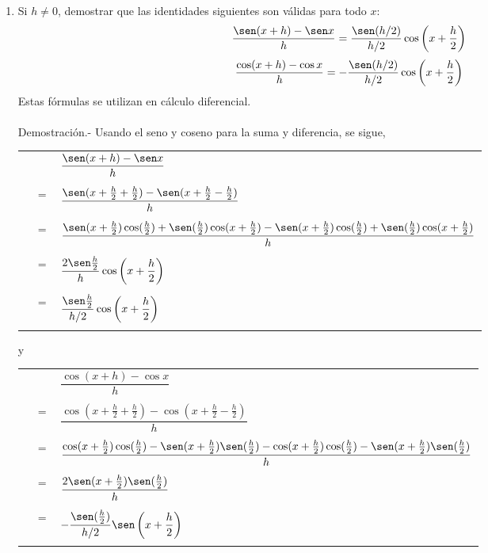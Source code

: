\begin{enumerate}[\bfseries 1.]
\item Si $h\neq 0$, demostrar que las identidades siguientes son válidas para todo $x$:
    $$\dfrac{\sen(x+h)-\sen x}{h} = \dfrac{\sen(h/2)}{h/2}\cos\left(x+\dfrac{h}{2}\right)$$
    $$\dfrac{\cos(x+h)-\cos x}{h} = -\dfrac{\sen(h/2)}{h/2}\cos\left(x+\dfrac{h}{2}\right)$$
    Estas fórmulas se utilizan en cálculo diferencial.\\\\
    Demostración.-\; Usando el seno y coseno para la suma y diferencia, se sigue,
    \begin{center}
	\begin{tabular}{rcl}
	    &&$\dfrac{\sen(x+h)-\sen x}{h}$\\\\
	    &$=$&$\dfrac{\sen(x+\frac{h}{2}+\frac{h}{2})-\sen(x+\frac{h}{2}-\frac{h}{2})}{h}$\\\\
					 &$=$&$\dfrac{\sen(x+\frac{h}{2})\cos(\frac{h}{2})+\sen(\frac{h}{2})\cos(x+\frac{h}{2})-\sen(x+\frac{h}{2})\cos (\frac{h}{2})+\sen(\frac{h}{2})\cos(x+\frac{h}{2})}{h}$\\\\
					 &$=$&$\dfrac{2\sen \frac{h}{2}}{h}\cos\left(x+\dfrac{h}{2}\right)$\\\\
					 &$=$&$\dfrac{\sen \frac{h}{2}}{h/2}\cos\left(x+\dfrac{h}{2}\right)$\\\\
	\end{tabular}
    \end{center}
    y
    \begin{center}
	\begin{tabular}{rcl}
	    &&$\dfrac{\cos(x+h)-\cos x}{h}$\\\\
	    &$=$&$\dfrac{\cos(x+\frac{h}{2}+\frac{h}{2})-\cos(x+\frac{h}{2}-\frac{h}{2})}{h}$\\\\
					 &$=$&$\dfrac{\cos(x+\frac{h}{2})\cos(\frac{h}{2})-\sen(x+\frac{h}{2})\sen(\frac{h}{2})-\cos(x+\frac{h}{2})\cos(\frac{h}{2})-\sen(x+\frac{h}{2})\sen(\frac{h}{2})}{h}$\\\\
					 &$=$&$\dfrac{2\sen(x+\frac{h}{2})\sen(\frac{h}{2})}{h}$\\\\
					 &$=$&$-\dfrac{\sen(\frac{h}{2})}{h/2}\sen\left(x+\dfrac{h}{2}\right)$\\\\
	\end{tabular}
    \end{center}


\end{enumerate}

